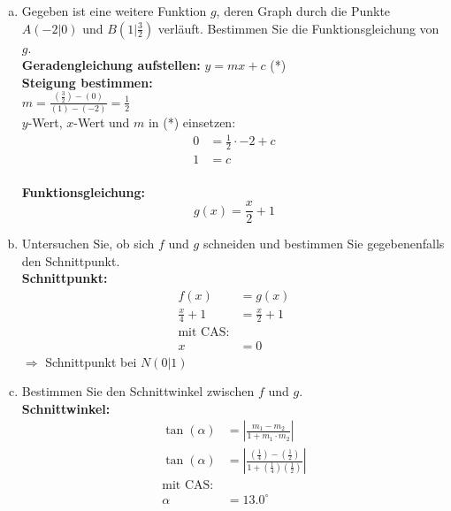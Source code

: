 \documentclass[12pt,fleqn]{article}
\theoremstyle{aufg}
\theoremstyle{bsp}
\begin{document}
\begin{flushleft}
\begin{enumerate}[a)]
\item 
Gegeben ist eine weitere Funktion $g$, deren Graph durch die Punkte $A(-2|0)$ und $B(1|\frac{3}{2})$ verl\"auft. Bestimmen Sie die Funktionsgleichung von $g$. \\ 
{\bf Geradengleichung aufstellen:} \quad $y=mx+c$ (*) \\ 
{\bf Steigung bestimmen:} \\ 
$m=\frac{(\frac{3}{2})-(0)}{(1)-(-2)}=\frac{1}{2}$ \\ 
$y$-Wert, $x$-Wert und $m$ in (*) einsetzen: 
\begin{align*} 
0&=\frac{1}{2}\cdot-2+ c \\ 
1&= c 
\end{align*} \\ 
{\bf Funktionsgleichung:} 
\[g(x)=\frac{x}{2} + 1\]
\item 
Untersuchen Sie, ob sich $f$ und $g$ schneiden und bestimmen Sie gegebenenfalls den Schnittpunkt. \\ 
{\bf Schnittpunkt:} 
\begin{align*} 
f(x)&=g(x) \\ 
\frac{x}{4} + 1&=\frac{x}{2} + 1 \\ 
\text{mit CAS:} \\ 
x&=0\end{align*} 
$\Rightarrow$ Schnittpunkt bei $N(0|1)$ \\ 

\item 
Bestimmen Sie den Schnittwinkel zwischen $f$ und $g$. \\ 
{\bf Schnittwinkel:} \\ 
\begin{align*} 
\tan(\alpha) &=\left|\frac{m_1-m_2}{1+m_1\cdot m_2}\right| \\ 
\tan(\alpha) &=\left|\frac{(\frac{1}{4})-(\frac{1}{2})}{1+(\frac{1}{4})(\frac{1}{2})}\right| \\ 
\text{mit CAS:} \\ 
\alpha &=13.0^{\circ} 
\end{align*} 

\end{enumerate} 
\end{flushleft} 
    
\end{document}
